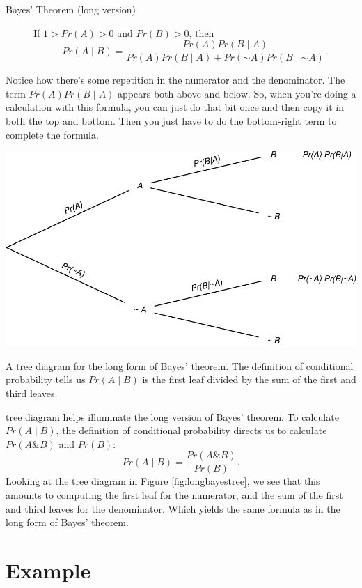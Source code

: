 \documentclass[justified]{tufte-book}
\newcommand{\given}{\mid}
\renewcommand{\neg}{\mathbin{\sim}}
\renewcommand{\wedge}{\mathbin{\&}}
\newcommand{\p}{Pr}
\theoremstyle{definition}
\theoremstyle{definition}
\theoremstyle{definition}
\theoremstyle{remark}
\begin{document}
\begin{description}
\item[Bayes' Theorem (long version)]
If \(1 > \p(A) > 0\) and \(\p(B)>0\), then
\[ \p(A \given B) = \frac{\p(A)\p(B \given A)}{\p(A)\p(B \given A) + \p(\neg A)\p(B \given \neg A)}. \]
\end{description}

Notice how there's some repetition in the numerator and the denominator. The term \(\p(A)\p(B \given A)\) appears both above and below. So, when you're doing a calculation with this formula, you can just do that bit once and then copy it in both the top and bottom. Then you just have to do the bottom-right term to complete the formula.

\begin{marginfigure}
\includegraphics{_main_files/figure-latex/longbayestree-1} \caption[A tree diagram for the long form of Bayes' theorem]{A tree diagram for the long form of Bayes' theorem. The definition of conditional probability tells us $\p(A \given B)$ is the first leaf divided by the sum of the first and third leaves.}\label{fig:longbayestree}
\end{marginfigure}

 tree diagram helps illuminate the long version of Bayes' theorem. To calculate \(\p(A \given B)\), the definition of conditional probability directs us to calculate \(\p(A \wedge B)\) and \(\p(B)\):
\[ \p(A \given B) = \frac{ \p(A \wedge B) }{ \p(B) }. \]
Looking at the tree diagram in Figure \ref{fig:longbayestree}, we see that this amounts to computing the first leaf for the numerator, and the sum of the first and third leaves for the denominator. Which yields the same formula as in the long form of Bayes' theorem.

\hypertarget{example-1}{%
\section{Example}\label{example-1}}
\end{document}
